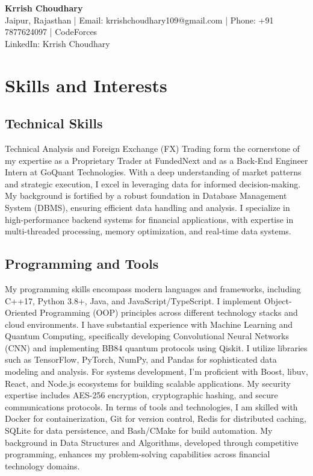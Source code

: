 \documentclass[11pt,a4paper]{article}
\begin{document}

\begin{center}
    {\Huge\textbf{Krrish Choudhary}}\\[5pt]
    {\small Jaipur, Rajasthan | Email: krrishchoudhary109@gmail.com | Phone: +91 7877624097 | CodeForces}\\
    {\small LinkedIn: Krrish Choudhary}\\
\end{center}

\section{Skills and Interests}

\subsection*{Technical Skills}
Technical Analysis and Foreign Exchange (FX) Trading form the cornerstone of my expertise as a Proprietary Trader at FundedNext and as a Back-End Engineer Intern at GoQuant Technologies. With a deep understanding of market patterns and strategic execution, I excel in leveraging data for informed decision-making. My background is fortified by a robust foundation in Database Management System (DBMS), ensuring efficient data handling and analysis. I specialize in high-performance backend systems for financial applications, with expertise in multi-threaded processing, memory optimization, and real-time data systems.

\subsection*{Programming and Tools}
My programming skills encompass modern languages and frameworks, including C++17, Python 3.8+, Java, and JavaScript/TypeScript. I implement Object-Oriented Programming (OOP) principles across different technology stacks and cloud environments. I have substantial experience with Machine Learning and Quantum Computing, specifically developing Convolutional Neural Networks (CNN) and implementing BB84 quantum protocols using Qiskit. I utilize libraries such as TensorFlow, PyTorch, NumPy, and Pandas for sophisticated data modeling and analysis. For systems development, I'm proficient with Boost, libuv, React, and Node.js ecosystems for building scalable applications. My security expertise includes AES-256 encryption, cryptographic hashing, and secure communications protocols. In terms of tools and technologies, I am skilled with Docker for containerization, Git for version control, Redis for distributed caching, SQLite for data persistence, and Bash/CMake for build automation. My background in Data Structures and Algorithms, developed through competitive programming, enhances my problem-solving capabilities across financial technology domains.
\end{document}
